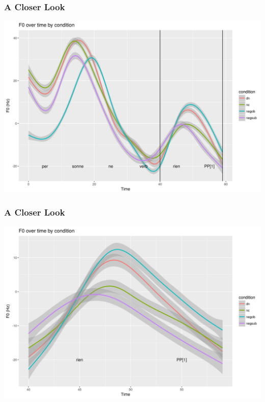 \documentclass{beamer}
\begin{document}
\begin{frame}
\frametitle{A Closer Look}
\begin{center}
\includegraphics[width=\linewidth]{figures/overall_pitch_z.jpeg}
\end{center}
\end{frame}

\begin{frame}
\frametitle{A Closer Look}
\begin{center}
\includegraphics[width=\linewidth]{figures/f0_zoomed.jpeg}
\end{center}
\end{frame}
\end{document}
